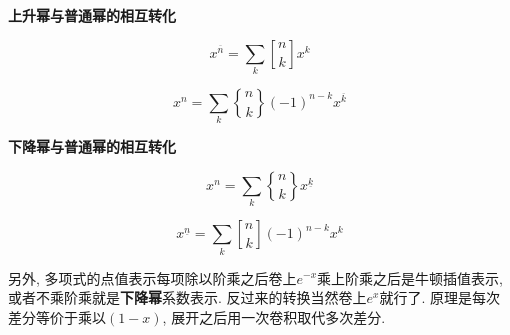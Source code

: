 \textbf{上升幂与普通幂的相互转化}

$$ x^{\overline{n}}=\sum_{k} {n \brack k} x^k $$

$$ x^n=\sum_{k} {n \brace k} (-1)^{n-k} x^{\overline{k}} $$

\textbf{下降幂与普通幂的相互转化}

$$ x^n=\sum_{k} {n \brace k} x^{\underline{k}} $$

$$ x^{\underline{n}}=\sum_{k} {n \brack k} (-1)^{n-k} x^k $$

另外, 多项式的点值表示每项除以阶乘之后卷上$e^{-x}$乘上阶乘之后是牛顿插值表示, 或者不乘阶乘就是\textbf{下降幂}系数表示. 反过来的转换当然卷上$e^x$就行了. 原理是每次差分等价于乘以$(1 - x)$, 展开之后用一次卷积取代多次差分.